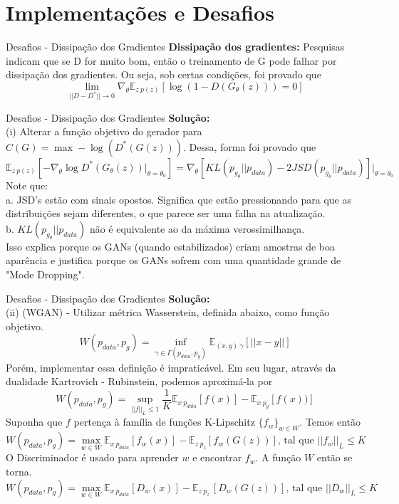 \documentclass[10pt]{beamer}
\begin{document}
\AtBeginSection{}
\section[Desafios]{Implementações e Desafios}
\begin{frame}[fragile]{Desafios - Dissipação dos Gradientes}
  \small
  \textbf{Dissipação dos gradientes:}
  Pesquisas indicam que se D for muito bom, então o treinamento de G pode falhar por dissipação dos gradientes. Ou seja, sob certas condições, foi provado que
  $$\lim_{||D-D^*||\to0}\nabla_{\theta}\mathbb{E}_{z~p(z)}\left[\log{(1-D(G_{\theta}(z)))}=0\right]$$

\end{frame}

\begin{frame}[fragile]{Desafios - Dissipação dos Gradientes}
  \small
  \textbf{Solução:}\\
  (i) Alterar a função objetivo do gerador para $C(G) = \max -\log(D^*(G(z)))$. Dessa, forma foi provado que
  $$\mathbb{E}_{z~p(z)}\left[-\nabla_{\theta}\log{D^*(G_{\theta}(z))|_{\theta=\theta_{0}}} \right] = \nabla_{\theta}[KL(p_{g_{\theta}}||p_{data}) - 2JSD(p_{g_{\theta}}||p_{data})]|_{\theta = \theta_0} $$
  Note que: \\
  a. JSD's estão com sinais opostos. Significa que estão pressionando para que as distribuições sejam diferentes, o que parece ser uma falha na atualização.\\
  b. $KL(p_{g_{\theta}}||p_{data})$ não é equivalente ao da máxima verossimilhança.\\
  Isso explica porque os GANs (quando estabilizados) criam amostras de boa aparência e justifica porque os GANs sofrem com uma quantidade grande de "Mode Dropping".
\end{frame}

\begin{frame}[fragile]{Desafios - Dissipação dos Gradientes}
  \small
  \textbf{Solução:}\\
  (ii) (WGAN) - Utilizar métrica Wasserstein, definida abaixo, como função objetivo.
  $$W(p_{data},p_g) = \inf_{\gamma\in\Gamma(p_{data},p_g)}\mathbb{E}_{(x,y)~\gamma}[||x-y||] $$
  \pause
  Porém, implementar essa definição é impraticável. Em seu lugar, através da dualidade Kartrovich - Rubinstein, podemos aproximá-la por
  $$W(p_{data},p_g) = \sup_{||f||_L\leq1} \frac{1}{K}\mathbb{E}_{x~p_{data}}[f(x)]- \mathbb{E}_{x~p_g}[f(x))]$$
  \pause
  Suponha que $f$ pertença à família de funções K-Lipschitz $\{f_w\}_{w \in W}$. Temos então
  $$W(p_{data},p_g) = \max_{w \in W} \mathbb{E}_{x~p_{data}}[f_w(x)] - \mathbb{E}_{z~p_z}[f_w(G(z))] \text{, tal que } ||f_w||_L \leq K$$
  \pause
  O Discriminador é usado para aprender $w$ e encontrar $f_w$. A função $W$ então se torna.
  $$W(p_{data},p_g) = \max_{w \in W} \mathbb{E}_{x~p_{data}}[D_w(x)] - \mathbb{E}_{z~p_z~}[D_w(G(z))] \text{, tal que } ||D_w||_L \leq K$$
\end{frame}
\end{document}
